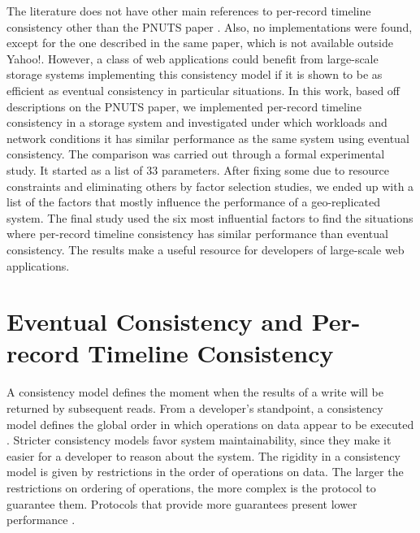 \documentclass[doublespacing]{bmcart}
\begin{document}
The literature does not have other main references to per-record timeline
consistency other than the PNUTS paper \cite{Cooper2008}. Also, no
implementations were found, except for the one described in the same paper,
which is not available outside Yahoo!. However, a class of web applications
could benefit from large-scale storage systems implementing this consistency
model if it is shown to be as efficient as eventual consistency in particular
situations. In this work, based off descriptions on the PNUTS paper, we
implemented per-record timeline consistency in a storage system and
investigated under which workloads and network conditions it has similar
performance as the same system using eventual consistency. The comparison was
carried out through a formal experimental study. It started as a list of 33
parameters. After fixing some due to resource constraints and eliminating
others by factor selection studies, we ended up with a list of the factors that
mostly influence the performance of a geo-replicated system. The final study
used the six most influential factors to find the situations where per-record
timeline consistency has similar performance than eventual consistency. The
results make a useful resource for developers of large-scale web applications.

\section{Eventual Consistency and Per-record Timeline Consistency}

A consistency model defines the moment when the results of a write will be
returned by subsequent reads. From a developer's standpoint, a consistency
model defines the global order in which operations on data appear to be
executed \cite{Adve1995}. Stricter consistency models favor system
maintainability, since they make it easier for a developer to reason about the
system. The rigidity in a consistency model is given by restrictions in the
order of operations on data. The larger the restrictions on ordering of
operations, the more complex is the protocol to guarantee them. Protocols that
provide more guarantees present lower performance \cite{Mosberger1993}.
\end{document}
